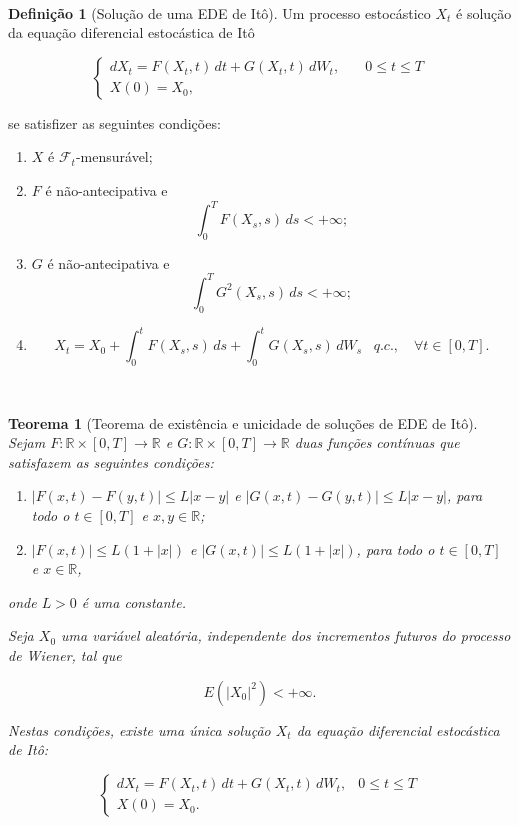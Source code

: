 \documentclass[
  11pt,
  a4paper,
]{book}
\newtheorem{theorem}{Teorema}[chapter]
\theoremstyle{definition}
\newtheorem{definition}{Definição}[chapter]
\theoremstyle{definition}
\theoremstyle{definition}
\theoremstyle{definition}
\theoremstyle{remark}
\begin{document}
\(\,\)

\begin{definition}[Solução de uma EDE de Itô]

Um processo estocástico \(X_t\) é solução da equação diferencial estocástica de Itô

\[
\label{sol_ito}
\begin{cases}
dX_t = F(X_t, t) \, dt + G(X_t, t) \, dW_t, & \quad 0 \leq t \leq T \\
X(0) = X_0, & 
\end{cases}
\]

se satisfizer as seguintes condições:

\begin{enumerate}
\def\labelenumi{(\roman{enumi})}
\item
  \(X\) é \(\mathcal{F}_t\)-mensurável;
\item
  \(F\) é não-antecipativa e
  \[\int_{0}^{T} F(X_s, s) \, ds < +\infty;\]
\item
  \(G\) é não-antecipativa e
  \[\int_{0}^{T} G^2(X_s, s) \, ds < +\infty;\]
\item
  \[
  X_t = X_0 + \int_{0}^{t} F(X_s, s) \, ds + \int_{0}^{t} G(X_s, s) \, dW_s 
  \hspace{10pt} q.c., \quad \forall t \in [0, T].
  \]
\end{enumerate}

\end{definition}

\(\,\)

\begin{theorem}[Teorema de existência e unicidade de soluções de EDE de Itô]
Sejam \(F:\mathbb{R} \times [0,T] \rightarrow \mathbb{R}\) e \(G:\mathbb{R} \times [0,T] \rightarrow \mathbb{R}\) duas funções contínuas que satisfazem as seguintes condições:

\begin{enumerate}
\def\labelenumi{(\roman{enumi})}
\item
  \(|F(x,t) - F(y,t)| \leq L |x - y|\) e \(|G(x,t) - G(y,t)| \leq L |x - y|\), para todo o \(t \in [0,T]\) e \(x, y \in \mathbb{R}\);
\item
  \(|F(x,t)| \leq L(1 + |x|)\) e \(|G(x,t)| \leq L(1 + |x|)\), para todo o \(t \in [0,T]\) e \(x \in \mathbb{R}\),
\end{enumerate}

onde \(L > 0\) é uma constante.

Seja \(X_0\) uma variável aleatória, independente dos incrementos futuros do processo de Wiener, tal que

\[
E(|X_0|^2) < +\infty.
\]

Nestas condições, existe uma única solução \(X_t\) da equação diferencial estocástica de Itô:

\[
\begin{cases}
dX_t = F(X_t, t)\,dt + G(X_t, t)\,dW_t, & 0 \leq t \leq T \\
X(0) = X_0. &
\end{cases}
\label{eq:sol-ito}
\]
\end{theorem}
\end{document}
